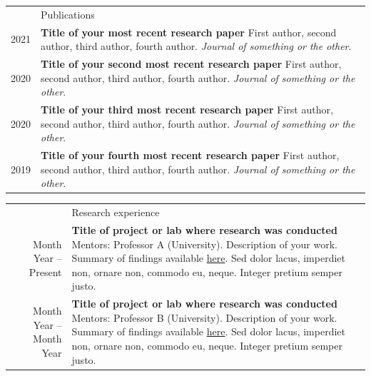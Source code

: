 \documentclass[letterpaper, 11pt]{article}
\newcommand{\headingfont}{\Large\color{OliveGreen}}
\newenvironment{SectionTable}[1]{
	\renewcommand*{\arraystretch}{1.4}
	\setlength{\tabcolsep}{10pt}
	\begin{longtable}{Rp{5.2in}} & #1 \\}
{\end{longtable}\vspace{-.3cm}}
\begin{document}

\begin{SectionTable}{\headingfont Publications} 
2021 & 
\textbf{Title of your most recent research paper} \newline
First author, second author, third author, fourth author. \newline
\textit{Journal of something or the other}. \\

2020 & 
\textbf{Title of your second most recent research paper} \newline
First author, second author, third author, fourth author. \newline
\textit{Journal of something or the other}. \\

2020 & 
\textbf{Title of your third most recent research paper} \newline
First author, second author, third author, fourth author. \newline
\textit{Journal of something or the other}. \\

2019 & 
\textbf{Title of your fourth most recent research paper} \newline
First author, second author, third author, fourth author. \newline
\textit{Journal of something or the other}.
\end{SectionTable}


\begin{SectionTable}{\headingfont Research experience}
Month Year -- Present &
\textbf{Title of project or lab where research was conducted} \newline
Mentors: Professor A (University). \newline
Description of your work. Summary of findings available \href{https://en.wikibooks.org/wiki/LaTeX/Hyperlinks}{here}. Sed dolor lacus, imperdiet non, ornare non, commodo eu, neque. Integer pretium semper justo. \\

Month Year -- Month Year &
\textbf{Title of project or lab where research was conducted} \newline
Mentors: Professor B (University). \newline
Description of your work. Summary of findings available \href{https://en.wikibooks.org/wiki/LaTeX/Hyperlinks}{here}. Sed dolor lacus, imperdiet non, ornare non, commodo eu, neque. Integer pretium semper justo. \\
\end{SectionTable}
\end{document}
